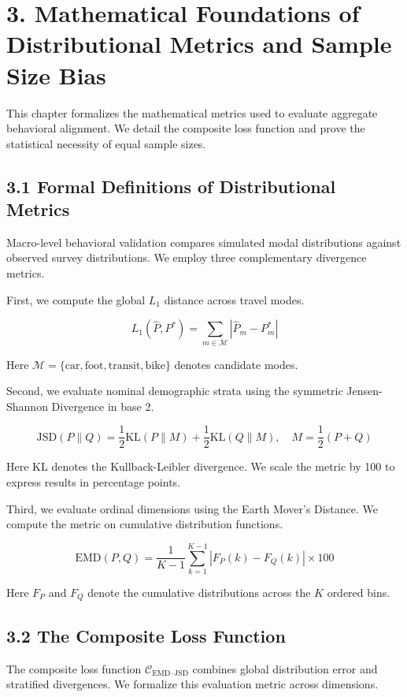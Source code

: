 \section{3. Mathematical Foundations of Distributional Metrics and Sample Size Bias}

This chapter formalizes the mathematical metrics used to evaluate aggregate behavioral alignment. We detail the composite loss function and prove the statistical necessity of equal sample sizes.

\subsection{3.1 Formal Definitions of Distributional Metrics}

Macro-level behavioral validation compares simulated modal distributions against observed survey distributions. We employ three complementary divergence metrics.

First, we compute the global $L_1$ distance across travel modes.

\[
L_1(\hat{P}, P^*) = \sum_{m \in \mathcal{M}} |\hat{P}_m - P_m^*|
\]

Here $\mathcal{M} = \{\text{car}, \text{foot}, \text{transit}, \text{bike}\}$ denotes candidate modes.

Second, we evaluate nominal demographic strata using the symmetric Jensen-Shannon Divergence in base 2.

\[
\mathrm{JSD}(P \parallel Q) = \frac{1}{2}\mathrm{KL}(P \parallel M) + \frac{1}{2}\mathrm{KL}(Q \parallel M), \quad M = \frac{1}{2}(P + Q)
\]

Here $\mathrm{KL}$ denotes the Kullback-Leibler divergence. We scale the metric by 100 to express results in percentage points.

Third, we evaluate ordinal dimensions using the Earth Mover's Distance. We compute the metric on cumulative distribution functions.

\[
\mathrm{EMD}(P, Q) = \frac{1}{K-1} \sum_{k=1}^{K-1} |F_P(k) - F_Q(k)| \times 100
\]

Here $F_P$ and $F_Q$ denote the cumulative distributions across the $K$ ordered bins.

\subsection{3.2 The Composite Loss Function}

The composite loss function $\mathcal{C}_{\text{EMD–JSD}}$ combines global distribution error and stratified divergences. We formalize this evaluation metric across dimensions.


